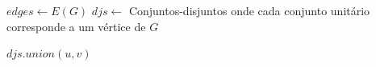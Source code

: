 \begin{algorithm}[!ht]
\begin{footnotesize}
\SetAlgoLined
{}
\Begin
{
    $edges \gets E(G)$\;
    $djs \gets $ Conjuntos-disjuntos onde cada conjunto unitário corresponde a um vértice de $G$\;
    
    {
        {
            \;
        }
        
        $djs.union(u, v)$\;
    }
    
    \;
}
\caption{\textsc{$is\_cyclic\_disjoint\_sets$}\label{alg:is_cyclic_disjoin_sets}}
\end{footnotesize}
\end{algorithm}